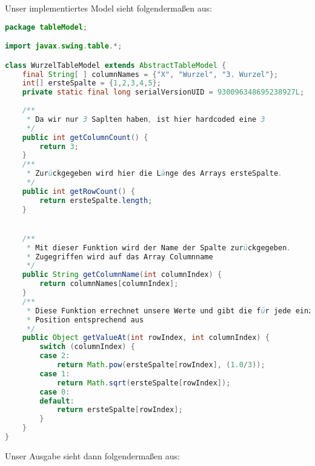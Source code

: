 Unser implementiertes Model sieht folgendermaßen aus:
\begin{lstlisting}[language=java, style=java, caption={WurzelTableModel.java},
label={lst:lst1}]
package tableModel;

import javax.swing.table.*;

class WurzelTableModel extends AbstractTableModel {
	final String[ ] columnNames = {"X", "Wurzel", "3. Wurzel"};
	int[] ersteSpalte = {1,2,3,4,5};
	private static final long serialVersionUID = 930096348695238927L;
	
	/**
	 * Da wir nur 3 Saplten haben, ist hier hardcoded eine 3
	 */
	public int getColumnCount() {
		return 3;
	}
    /**
	 * Zurückgegeben wird hier die Länge des Arrays ersteSpalte.
	 */
	public int getRowCount() {
		return ersteSpalte.length;
	}


	/**
	 * Mit dieser Funktion wird der Name der Spalte zurückgegeben.
	 * Zugegriffen wird auf das Array Columnname
	 */
	public String getColumnName(int columnIndex) {
		return columnNames[columnIndex];
	}
	/**
	 * Diese Funktion errechnet unsere Werte und gibt die für jede einzelne
	 * Position entsprechend aus
	 */
	public Object getValueAt(int rowIndex, int columnIndex) {
		switch (columnIndex) {
		case 2:
			return Math.pow(ersteSpalte[rowIndex], (1.0/3));
		case 1:
			return Math.sqrt(ersteSpalte[rowIndex]);
		case 0:
		default:
			return ersteSpalte[rowIndex];
		}
	}
}
\end{lstlisting}

Unser Ausgabe sieht dann folgendermaßen aus:


\clearpage
